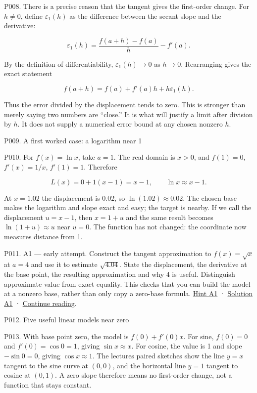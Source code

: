 \documentclass[
  11pt,
]{article}
\providecommand{\gt}{>}
\begin{document}
P008. There is a precise reason that the tangent gives the first-order
change. For \(h\ne0\), define \(\varepsilon_1(h)\) as the difference
between the secant slope and the derivative:

\[
\varepsilon_1(h)=\frac{f(a+h)-f(a)}{h}-f'(a).
\]

By the definition of differentiability, \(\varepsilon_1(h)\to0\) as
\(h\to0\). Rearranging gives the exact statement

\[
f(a+h)=f(a)+f'(a)h+h\varepsilon_1(h).
\]

Thus the error divided by the displacement tends to zero. This is
stronger than merely saying two numbers are ``close.'' It is what will
justify a limit after division by \(h\). It does not supply a numerical
error bound at any chosen nonzero \(h\).

P009. A first worked case: a logarithm near 1

P010. For \(f(x)=\ln x\), take \(a=1\). The real domain is \(x\gt 0\),
and \(f(1)=0\), \(f'(x)=1/x\), \(f'(1)=1\). Therefore

\[
L(x)=0+1(x-1)=x-1,\qquad \ln x\approx x-1.
\]

At \(x=1.02\) the displacement is \(0.02\), so \(\ln(1.02)\approx0.02\).
The chosen base makes the logarithm and slope exact and easy; the target
is nearby. If we call the displacement \(u=x-1\), then \(x=1+u\) and the
same result becomes \(\ln(1+u)\approx u\) near \(u=0\). The function has
not changed: the coordinate now measures distance from 1.

P011. A1 --- early attempt. Construct the tangent approximation to
\(f(x)=\sqrt{x}\) at \(a=4\) and use it to estimate \(\sqrt{4.04}\).
State the displacement, the derivative at the base point, the resulting
approximation and why 4 is useful. Distinguish approximate value from
exact equality. This checks that you can build the model at a nonzero
base, rather than only copy a zero-base formula.
\protect\hyperlink{h1}{Hint A1} · \protect\hyperlink{s1}{Solution A1} ·
\protect\hyperlink{after-a1}{Continue reading}.

P012. Five useful linear models near zero

P013. With base point zero, the model is \(f(0)+f'(0)x\). For sine,
\(f(0)=0\) and \(f'(0)=\cos0=1\), giving \(\sin x\approx x\). For
cosine, the value is 1 and slope \(-\sin0=0\), giving
\(\cos x\approx1\). The lecture\textquotesingle s paired sketches show
the line \(y=x\) tangent to the sine curve at \((0,0)\), and the
horizontal line \(y=1\) tangent to cosine at \((0,1)\). A zero slope
therefore means no first-order change, not a function that stays
constant.
\end{document}
